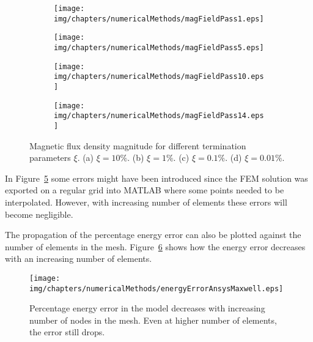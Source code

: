 \begin{figure}[htb]
        \centering
        \begin{subfigure}[b]{0.47\textwidth}
                \texttt{[image: img/chapters/numericalMethods/magFieldPass1.eps]}
                \caption{}
                \label{fig:magFiledPass1}
        \end{subfigure}
        \begin{subfigure}[b]{0.47\textwidth}
                \texttt{[image: img/chapters/numericalMethods/magFieldPass5.eps]}
                \caption{}
                \label{fig:magFieldPass5}
        \end{subfigure}
        \begin{subfigure}[b]{0.47\textwidth}
                \texttt{[image: img/chapters/numericalMethods/magFieldPass10.eps]}
                \caption{}
                \label{fig:magFieldPass10}
        \end{subfigure}
        \begin{subfigure}[b]{0.47\textwidth}
                \texttt{[image: img/chapters/numericalMethods/magFieldPass14.eps]}
                \caption{}
                \label{fig:magFieldPass14}
        \end{subfigure}
        \caption[FEM magnetic flux density result at the magnet's centre plane]{Magnetic flux density magnitude for different termination parameters $\xi$. (a) $\xi=10\%$. (b) $\xi=1\%$. (c) $\xi=0.1\%$. (d) $\xi=0.01\%$.}
        \label{fig:magFieldPass}
\end{figure}

In Figure~\ref{fig:magFieldPass} some errors might have been introduced since the FEM solution was exported on a regular grid into MATLAB where some points needed to be interpolated. However, with increasing number of elements these errors will become negligible. 

The propagation of the percentage energy error can also be plotted against the number of elements in the mesh. Figure~\ref{fig:energyErrorAnsysMaxwell} shows how the energy error decreases with an increasing number of elements. 

\begin{figure}[htb]
  \centering
      \texttt{[image: img/chapters/numericalMethods/energyErrorAnsysMaxwell.eps]}
  \caption[Percentage energy error in finite element system]{Percentage energy error in the model decreases with increasing number of nodes in the mesh. Even at higher number of elements, the error still drops.}
  \label{fig:energyErrorAnsysMaxwell}
\end{figure}

